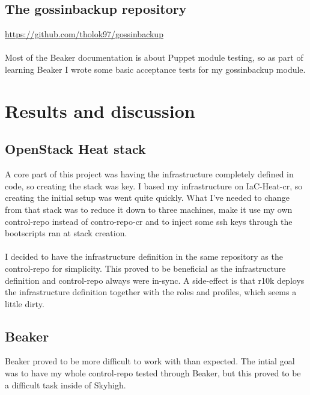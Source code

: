 \subsection{The gossinbackup repository}

\url{https://github.com/tholok97/gossinbackup}
\\
\\
Most of the Beaker documentation is about Puppet module testing, so as part of learning Beaker I wrote some basic acceptance tests for my gossinbackup module.


\section{Results and discussion}

\subsection{OpenStack Heat stack}

A core part of this project was having the infrastructure completely defined in code, so creating the stack was key. I based my infrastructure on IaC-Heat-cr\cite{iacheatcrgithub}, so creating the initial setup was went quite quickly. What I've needed to change from that stack was to reduce it down to three machines, make it use my own control-repo instead of contro-repo-cr\cite{controlrepocr} and to inject some ssh keys through the bootscripts ran at stack creation.
\\
\\
I decided to have the infrastructure definition in the same repository as the control-repo for simplicity. This proved to be beneficial as the infrastructure definition and control-repo always were in-sync. A side-effect is that r10k deploys the infrastructure definition together with the roles and profiles, which seems a little dirty. 

\subsection{Beaker}

Beaker proved to be more difficult to work with than expected. The intial goal was to have my whole control-repo tested through Beaker, but this proved to be a difficult task inside of Skyhigh. 

